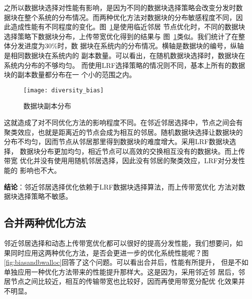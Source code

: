 之所以数据块选择对性能有影响，是因为不同的数据块选择策略会改变分发时数
据块在整个系统的分布情况。而两种优化方法对数据块的分布敏感程度不同，因
此造成性能有不同程度的变化。图~\ref{fig:diversity_bias}是使用临近邻居
节点优化时，不同的数据块选择策略下数据块分布，上传带宽优化得到的结果与
图~\ref{fig:diversity_bias}类似。我们统计了在整体分发进度为30\%时，数
据块在系统内的分布情况。横轴是数据块的编号，纵轴是相同数据块在系统内的
副本数量。可以看出，在随机数据块选择时，数据块在系统内分布的不够均匀。
而使用LRF选择策略的情况则不同，基本上所有的数据块的副本数量都分布在一
个小的范围之内。

\begin{figure}
  \centering
  \begin{minipage}{0.6\linewidth}
    \centering
    \texttt{[image: diversity\_bias]}
    \caption{数据块副本分布}
    \label{fig:diversity_bias}
  \end{minipage}
\end{figure}


这就造成了对不同优化方法的影响程度不同。在邻近邻居选择中，节点之间会有
聚类效应，也就是距离近的节点会成为相互的邻居。随机数据块选择让数据块的
分布不均匀，因而节点从邻居那里得到数据块的难度增大。采用LRF数据块选择，
数据块分布更加均匀，相近节点可以高效的交换相互没有的数据块。而上传带宽
优化并没有使用用随机邻居选择，因此没有邻居的聚类效应，LRF对分发性能的
影响也不大。


\textbf{结论}：邻近邻居选择优化依赖于LRF数据块选择算法，而上传带宽优化
方法对数据块选择策略不敏感。


\subsection{合并两种优化方法}

邻近邻居选择和动态上传带宽优化都可以很好的提高分发性能，我们想要问，如
果同时应用这两种优化方法，是否会更进一步的优化系统性能呢？图~
\ref{fig:biasandbwalloc}回答了这个问题。可以看出合并后，性能有所提升，
但是不如单独应用一种优化方法带来的性能提升那样大。这是因为，采用邻近邻
居后，邻居节点之间比较近，相互的传输带宽也比较好，因而再使用带宽分配优
化效果并不明显。

